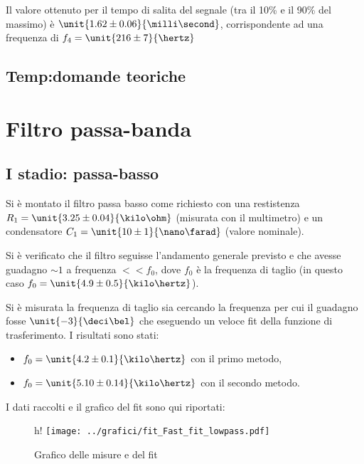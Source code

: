 \documentclass[10pt,a4paper]{article}
\begin{document}
Il valore ottenuto per il tempo di salita del segnale (tra il 10\% e il 90\% del massimo) è $\unit{1.62 \pm 0.06}{\milli\second}$, corrispondente ad una frequenza di $f_4 = \unit{216 \pm 7}{\hertz}$

\subsection{Temp:domande teoriche}

\section{Filtro passa-banda}

\subsection{I stadio: passa-basso}

Si è montato il filtro passa basso come richiesto con una restistenza $R_1 = \unit{3.25 \pm 0.04}{\kilo\ohm}$ (misurata con il multimetro) e un condensatore $C_1=\unit{10 \pm 1}{\nano\farad}$ (valore nominale).

Si è verificato che il filtro seguisse l'andamento generale previsto e che avesse guadagno $\sim 1$ a frequenza $<<f_0$, dove $f_0$ è la frequenza di taglio (in questo caso $f_0 = \unit{4.9 \pm 0.5}{\kilo\hertz}$).

Si è misurata la frequenza di taglio sia cercando la frequenza per cui il guadagno fosse $\unit{-3}{\deci\bel}$ che eseguendo un veloce fit della funzione di trasferimento.
I risultati sono stati:
\begin{itemize}
	\item $f_0 = \unit{4.2 \pm 0.1}{\kilo\hertz}$ con il primo metodo,
	\item $f_0 = \unit{5.10 \pm 0.14}{\kilo\hertz}$ con il secondo metodo.
\end{itemize}
I dati raccolti e il grafico del fit sono qui riportati:

\begin{figure}[h!]
	\centering
	
\end{figure}

\begin{figure}{h!}
	\centering
	\texttt{[image: ../grafici/fit\_Fast\_fit\_lowpass.pdf]}
	\caption{Grafico delle misure e del fit}
\end{figure}
\end{document}
